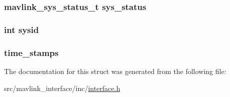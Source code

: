 \subsubsection[{\texorpdfstring{sys\+\_\+status}{sys_status}}]{\setlength{\rightskip}{0pt plus 5cm}mavlink\+\_\+sys\+\_\+status\+\_\+t sys\+\_\+status}\hypertarget{struct_mavlink___messages_ae30043ef99cf3612838c79efec1baf8d}{}\label{struct_mavlink___messages_ae30043ef99cf3612838c79efec1baf8d}
\subsubsection[{\texorpdfstring{sysid}{sysid}}]{\setlength{\rightskip}{0pt plus 5cm}int sysid}\hypertarget{struct_mavlink___messages_a7a9e72f297c762c6d1b36c4c1f83a7ec}{}\label{struct_mavlink___messages_a7a9e72f297c762c6d1b36c4c1f83a7ec}
\subsubsection[{\texorpdfstring{time\+\_\+stamps}{time_stamps}}]{ time\+\_\+stamps}\hypertarget{struct_mavlink___messages_aaa9e25fa47c4a823e4d15ce2798286f1}{}\label{struct_mavlink___messages_aaa9e25fa47c4a823e4d15ce2798286f1}


The documentation for this struct was generated from the following file\+:\begin{DoxyCompactItemize}
\item 
src/mavlink\+\_\+interface/inc/\hyperlink{interface_8h}{interface.\+h}\end{DoxyCompactItemize}
